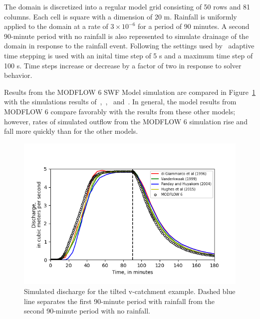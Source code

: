 \documentclass[fleqn]{article}
\begin{document}
The domain is discretized into a regular model grid consisting of 50 rows and 81 columns.  Each cell is square with a dimension of 20 m.  Rainfall is uniformly applied to the domain at a rate of $3 \times 10^{-6}$ for a period of 90 minutes.  A second 90-minute period with no rainfall is also represented to simulate drainage of the domain in response to the rainfall event.  Following the settings used by~\cite{panday2004} adaptive time stepping is used with an inital time step of 5 s and a maximum time step of 100 s.  Time steps increase or decrease by a factor of two in response to solver behavior.

Results from the MODFLOW 6 SWF Model simulation are compared in Figure~\ref{fig:vcatch} with the simulations results of~\cite{digiammarco1996},~\cite{VanderKwaak1999},~\cite{panday2004} and~\cite{hughes2015}.  In general, the model results from MODFLOW 6 compare favorably with the results from these other models; however, rates of simulated outflow from the MODFLOW 6 simulation rise and fall more quickly than for the other models.

\begin{figure}
	\centering
	\includegraphics[scale=0.75]{figures/vcatch-results.png}
	\caption[Simulated discharge for the tilted v-catchment example.]{Simulated discharge for the tilted v-catchment example.  Dashed blue line separates the first 90-minute period with rainfall from the second 90-minute period with no rainfall.}
	\label{fig:vcatch}
\end{figure}


 
\end{document}
